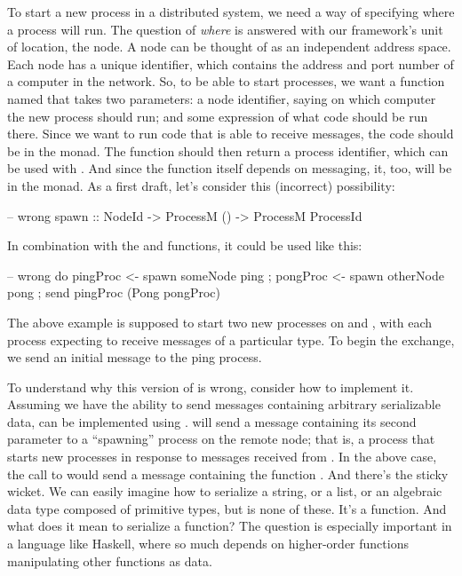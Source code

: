 \documentclass[preprint]{sigplanconf}
\begin{document}
To start a new process in a distributed system, we need a way of specifying where a process will run. The question of {\em where} is answered with our framework's unit of location, the node. A node can be thought of as an independent address space. Each node has a unique identifier, which contains the address and port number of a computer in the network. So, to be able to start processes, we want a function named  that takes two parameters: a node identifier, saying on which computer the new process should run; and some expression of what code should be run there. Since we want to run code that is able to receive messages, the code should be in the  monad. The function should then return a process identifier, which can be used with . And since the  function itself depends on messaging, it, too, will be in the  monad. As a first draft, let's consider this (incorrect) possibility:

\begin{code}
-- wrong
spawn :: NodeId -> ProcessM () -> ProcessM ProcessId
\end{code}

In combination with the  and  functions, it could be used like this:

\begin{code}
-- wrong
do { pingProc <- spawn someNode ping
   ; pongProc <- spawn otherNode pong
   ; send pingProc (Pong pongProc) }
\end{code}

The above example is supposed to start two new processes on  and , with each process expecting to receive messages of a particular type. To begin the exchange, we send an initial message to the ping process.

To understand why this version of  is wrong, consider how to implement it. Assuming we have the ability to send messages containing arbitrary serializable data,  can be implemented using .   will send a message containing its second parameter to a ``spawning'' process on the remote node; that is, a process that starts new processes in response to messages received from . In the above case, the call to  would send a message containing the function . And there's the sticky wicket. We can easily imagine how to serialize a string, or a list, or an algebraic data type composed of primitive types, but  is none of these. It's a function. And what does it mean to serialize a function? The question is especially important in a language like Haskell, where so much depends on higher-order functions manipulating other functions as data.
\end{document}
